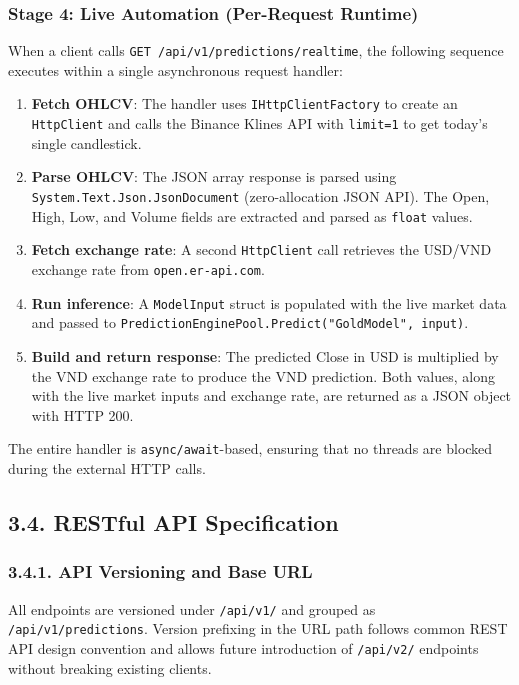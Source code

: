 \subsubsection{Stage 4: Live Automation (Per-Request Runtime)}
When a client calls \texttt{GET /api/v1/predictions/realtime}, the following sequence executes within a single asynchronous request handler:

\begin{enumerate}
  \item \textbf{Fetch OHLCV}: The handler uses \texttt{IHttpClientFactory} to create an \texttt{HttpClient} and calls the Binance Klines API with \texttt{limit=1} to get today's single candlestick.
  \item \textbf{Parse OHLCV}: The JSON array response is parsed using \texttt{System.Text.Json.JsonDocument} (zero-allocation JSON API). The Open, High, Low, and Volume fields are extracted and parsed as \texttt{float} values.
  \item \textbf{Fetch exchange rate}: A second \texttt{HttpClient} call retrieves the USD/VND exchange rate from \texttt{open.er-api.com}.
  \item \textbf{Run inference}: A \texttt{ModelInput} struct is populated with the live market data and passed to \texttt{PredictionEnginePool.Predict("GoldModel", input)}.
  \item \textbf{Build and return response}: The predicted Close in USD is multiplied by the VND exchange rate to produce the VND prediction. Both values, along with the live market inputs and exchange rate, are returned as a JSON object with HTTP 200.
\end{enumerate}

The entire handler is \texttt{async/await}-based, ensuring that no threads are blocked during the external HTTP calls.

\subsection{3.4. RESTful API Specification}

\subsubsection{3.4.1. API Versioning and Base URL}
All endpoints are versioned under \texttt{/api/v1/} and grouped as \texttt{/api/v1/predictions}. Version prefixing in the URL path follows common REST API design convention and allows future introduction of \texttt{/api/v2/} endpoints without breaking existing clients.


